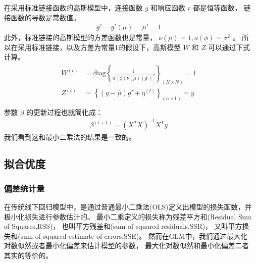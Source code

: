 \documentclass[letterpaper,10pt,english]{sphinxmanual}
\begin{document}
在采用标准链接函数的高斯模型中，连接函数 \(g\) 和响应函数 \(r\) 都是恒等函数，
链接函数的导数是常数值。
\begin{equation}\label{equation:高斯模型/content:高斯模型/content:14}
\begin{split}g' = g'(\mu) = \mu' = 1\end{split}
\end{equation}
此外，标准链接的高斯模型的方差函数也是常量， \(\nu(\mu)=1,a(\phi)=\sigma^2\) 。
所以在采用标准链接，以及方差为常量1的假设下，高斯模型 \(W\) 和 \(Z\) 可以通过下式计算。
\begin{align}\label{equation:高斯模型/content:高斯模型/content:15}\!\begin{aligned}
W^{(t)}  &= \text{diag} \left \{ \frac{ 1}{ a(\phi) \nu(\mu) ( g' )^2}
\right \}_{(N\times N)} = {1}\\
Z^{(t)}
&=  \left \{ (y- \hat{\mu}) g'  + \eta^{(t)}
\right \}_{(n\times 1 )} = y\\
\end{aligned}\end{align}
参数 \(\beta\) 的更新过程也就简化成：
\begin{equation}\label{equation:高斯模型/content:高斯模型/content:16}
\begin{split}\beta^{(t+1)} = (X^T X)^{-1} X^T  y\end{split}
\end{equation}
我们看到这和最小二乘法的结果是一致的。


\subsection{拟合优度}
\label{\detokenize{_u9ad8_u65af_u6a21_u578b/content:id7}}

\subsubsection{偏差统计量}
\label{\detokenize{_u9ad8_u65af_u6a21_u578b/content:id8}}
在传统线下回归模型中，是通过普通最小二乘法(OLS)定义出模型的损失函数，并极小化损失进行参数估计的。
最小二乘定义的损失称为残差平方和(Residual Sum of Squares,RSS)，
也叫平方残差和(sum of squared residuals,SSR)，
又叫平方损失和(sum of squared estimate of errors,SSE)。
然而在GLM中，我们通过最大化对数似然或者最小化偏差来估计模型的参数，
最大化对数似然和最小化偏差二者其实的等价的。
\end{document}
